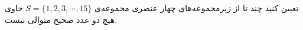    \p 
تعیین کنید چند تا از زیرمجموعه‌های چهار عنصری مجموعه‌ی
$S = \{1, 2, 3, \cdots, 15\}$
حاوی هیچ دو عدد صحیح متوالی نیست.